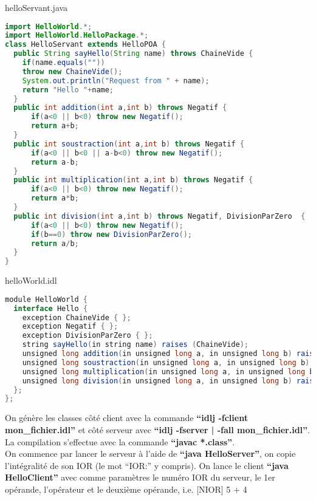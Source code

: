 \documentclass{article}
\begin{document}
helloServant.java
\begin{lstlisting}[language=JAVA]
import HelloWorld.*;
import HelloWorld.HelloPackage.*;
class HelloServant extends HelloPOA {
  public String sayHello(String name) throws ChaineVide {
    if(name.equals(""))
	throw new ChaineVide();
    System.out.println("Request from " + name);
    return "Hello "+name;
  }
  public int addition(int a,int b) throws Negatif {
	  if(a<0 || b<0) throw new Negatif();
	  return a+b;
  }
  public int soustraction(int a,int b) throws Negatif {
	  if(a<0 || b<0 || a-b<0) throw new Negatif();
	  return a-b;
  }
  public int multiplication(int a,int b) throws Negatif {
	  if(a<0 || b<0) throw new Negatif();
	  return a*b;
  }
  public int division(int a,int b) throws Negatif, DivisionParZero  {
	  if(a<0 || b<0) throw new Negatif();
	  if(b==0) throw new DivisionParZero();
	  return a/b;
  }
}


\end{lstlisting}

helloWorld.idl
\begin{lstlisting}[language=JAVA]
module HelloWorld {
  interface Hello {
    exception ChaineVide { };
    exception Negatif { };
    exception DivisionParZero { };
    string sayHello(in string name) raises (ChaineVide);
    unsigned long addition(in unsigned long a, in unsigned long b) raises (Negatif);
    unsigned long soustraction(in unsigned long a, in unsigned long b) raises (Negatif);
    unsigned long multiplication(in unsigned long a, in unsigned long b) raises (Negatif);
    unsigned long division(in unsigned long a, in unsigned long b) raises (Negatif, DivisionParZero);
  };
};
\end{lstlisting}

On génère les classes côté client avec la commande \textbf{``idlj -fclient mon\_fichier.idl''} et côté serveur avec \textbf{``idlj -fserver | -fall mon\_fichier.idl''}. La compilation s'effectue avec la commande \textbf{``javac *.class''}. \\

On commence par lancer le serveur à l'aide de \textbf{``java HelloServer''}, on copie l'intégralité de son IOR (le mot ``IOR:'' y compris). On lance le client \textbf{``java HelloClient''} avec comme paramètres le numéro IOR du serveur, le 1er opérande, l'opérateur et le deuxième opérande, i.e. [N\degres\space IOR] 5 + 4
\end{document}
